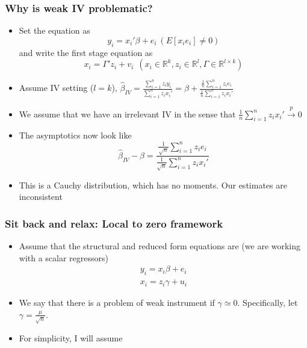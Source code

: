 \documentclass[aspectratio=169]{beamer}
\begin{document}
\begin{frame}
\frametitle{Why is weak IV problematic?}
\begin{itemize}
\item Set the equation as
\[
y_ i = x_i'\beta+e_i \ (E[x_ie_i]\neq0)
\]
and write the first stage equation as
\[
x_i = \Gamma'z_i + v_i \ \ (x_i\in\mathbb{R}^k, z_i\in\mathbb{R}^l, \Gamma\in\mathbb{R}^{l\times k})
\]
\item Assume IV setting ($l=k$), $\hat{\beta}_{IV}=\frac{\sum_{i=1}^n z_iy_i}{\sum_{i=1}^nz_ix_i'} = \beta+ \frac{\frac{1}{n}\sum_{i=1}^n z_ie_i}{\frac{1}{n}\sum_{i=1}^nz_ix_i'}$ 
\item We assume that we have an irrelevant IV in the sense that $\frac{1}{n}\sum_{i=1}^n z_ix_i'\xrightarrow{p}0$
\item The asymptotics now look like 
\[
\hat{\beta}_{IV}-\beta=\frac{\frac{1}{\sqrt{n}}\sum_{i=1}^n z_ie_i}{\frac{1}{\sqrt{n}}\sum_{i=1}^nz_ix_i'}
\]
\item This is a Cauchy distribution, which has no moments. Our estimates are inconsistent
\end{itemize}
\end{frame}

\begin{frame}
\frametitle{Sit back and relax: Local to zero framework}
\begin{itemize}
\item Assume that the structural and reduced form equations are (we are working with a scalar regressors)
\begin{gather*}
y_i = x_i\beta+ e_i \\ x_i=z_i\gamma+u_i
\end{gather*}
\item We say that there is a problem of weak instrument if $\gamma\simeq0$. Specifically, let $\gamma=\frac{\mu}{\sqrt{n}}$. 
\item For simplicity, I will assume
\end{itemize}
\end{frame}
\end{document}

